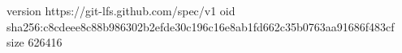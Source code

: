 version https://git-lfs.github.com/spec/v1
oid sha256:c8cdeee8c88b986302b2efde30c196c16e8ab1fd662c35b0763aa91686f483cf
size 626416
